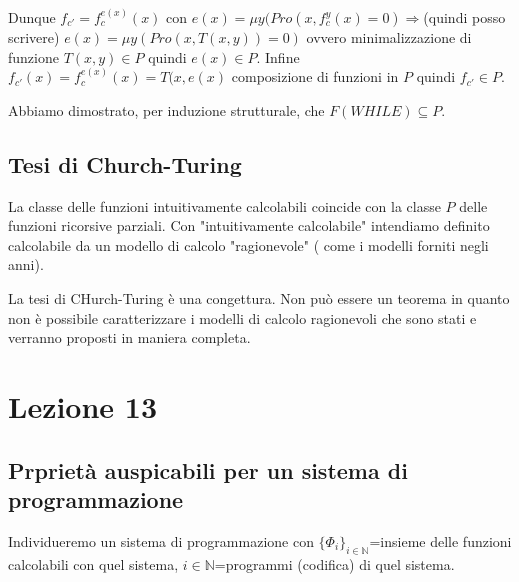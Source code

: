 \documentclass{article}
\begin{document}
\begin{itemize}
\begin{itemize}
Dunque $f_{c'}=f_c^{e(x)}(x)$ con $e(x)=\mu y(Pro(x,f_c^y(x)=0) \Rightarrow$(quindi posso scrivere) $e(x)=\mu y (Pro(x,T(x,y))=0)$ ovvero minimalizzazione di funzione $T(x,y) \in P$ quindi $e(x) \in P$. Infine $f_{c'}(x)=f_c^{e(x)}(x)=T(x,e(x)$ composizione di funzioni in $P$ quindi $f_{c'} \in P$.



\end{itemize}
\end{itemize}

Abbiamo dimostrato, per induzione strutturale, che $F(WHILE) \subseteq P$.


\subsection{Tesi di Church-Turing}
La classe delle funzioni intuitivamente calcolabili coincide con la classe $P$ delle funzioni ricorsive parziali. Con "intuitivamente calcolabile" intendiamo definito calcolabile da un modello di calcolo  "ragionevole" ( come i modelli forniti negli anni).



La tesi di CHurch-Turing è una congettura. Non può essere un teorema in quanto non è possibile caratterizzare i modelli di calcolo ragionevoli che sono stati e verranno proposti in maniera completa.

\section{Lezione 13}
\subsection{Prprietà auspicabili per un sistema di programmazione}
Individueremo un sistema di programmazione con $\{ \Phi_i \}_{i \in \mathbb{N}}$=insieme delle funzioni calcolabili con quel sistema, $i \in \mathbb{N}$=programmi (codifica) di quel sistema.
\end{document}
